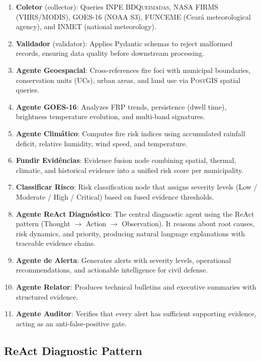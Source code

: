 \documentclass[11pt,twocolumn,a4paper]{article}
\newcommand{\abbrev}[1]{{\small\textsc{#1}}}
\begin{document}
\begin{enumerate}
  \item \textbf{Coletor} (collector): Queries \abbrev{INPE} \abbrev{BDQueimadas}, \abbrev{NASA} \abbrev{FIRMS} (\abbrev{VIIRS}/\abbrev{MODIS}), \abbrev{GOES-16} (NOAA S3), \abbrev{FUNCEME} (Cear\'{a} meteorological agency), and \abbrev{INMET} (national meteorology).
  \item \textbf{Validador} (validator): Applies Pydantic schemas to reject malformed records, ensuring data quality before downstream processing.
  \item \textbf{Agente Geoespacial}: Cross-references fire foci with municipal boundaries, conservation units (\abbrev{UC}s), urban areas, and land use via \abbrev{PostGIS} spatial queries.
  \item \textbf{Agente GOES-16}: Analyzes \abbrev{FRP} trends, persistence (dwell time), brightness temperature evolution, and multi-band signatures.
  \item \textbf{Agente Clim\'{a}tico}: Computes fire risk indices using accumulated rainfall deficit, relative humidity, wind speed, and temperature.
  \item \textbf{Fundir Evid\^encias}: Evidence fusion node combining spatial, thermal, climatic, and historical evidence into a unified risk score per municipality.
  \item \textbf{Classificar Risco}: Risk classification node that assigns severity levels (Low / Moderate / High / Critical) based on fused evidence thresholds.
  \item \textbf{Agente ReAct Diagn\'{o}stico}: The central diagnostic agent using the ReAct pattern (Thought $\to$ Action $\to$ Observation). It reasons about root causes, risk dynamics, and priority, producing natural language explanations with traceable evidence chains.
  \item \textbf{Agente de Alerta}: Generates alerts with severity levels, operational recommendations, and actionable intelligence for civil defense.
  \item \textbf{Agente Relator}: Produces technical bulletins and executive summaries with structured evidence.
  \item \textbf{Agente Auditor}: Verifies that every alert has sufficient supporting evidence, acting as an anti-false-positive gate.
\end{enumerate}

\subsection{ReAct Diagnostic Pattern}
\end{document}
